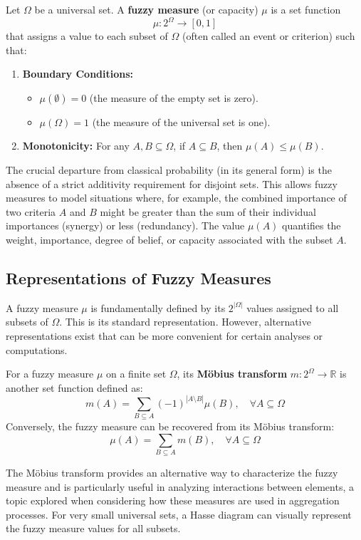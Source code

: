 \begin{definition}
Let $\Omega$ be a universal set. A \textbf{fuzzy measure} (or capacity) $\mu$ is a set function
\[ \mu: 2^\Omega \to [0, 1] \]
that assigns a value to each subset of $\Omega$ (often called an event or criterion) such that:
\begin{enumerate}
    \item \textbf{Boundary Conditions:}
    \begin{itemize}
        \item $\mu(\emptyset) = 0$ (the measure of the empty set is zero).
        \item $\mu(\Omega) = 1$ (the measure of the universal set is one).
    \end{itemize}
    \item \textbf{Monotonicity:} For any $A, B \subseteq \Omega$, if $A \subseteq B$, then $\mu(A) \le \mu(B)$.
\end{enumerate}
\end{definition}

The crucial departure from classical probability (in its general form) is the absence of a strict additivity requirement for disjoint sets. This allows fuzzy measures to model situations where, for example, the combined importance of two criteria $A$ and $B$ might be greater than the sum of their individual importances (synergy) or less (redundancy). The value $\mu(A)$ quantifies the weight, importance, degree of belief, or capacity associated with the subset $A$.

\subsection{Representations of Fuzzy Measures}
A fuzzy measure $\mu$ is fundamentally defined by its $2^{|\Omega|}$ values assigned to all subsets of $\Omega$. This is its standard representation. However, alternative representations exist that can be more convenient for certain analyses or computations.
\begin{definition}
For a fuzzy measure $\mu$ on a finite set $\Omega$, its \textbf{Möbius transform} $m: 2^\Omega \to \mathbb{R}$ is another set function defined as:
\[ m(A) = \sum_{B \subseteq A} (-1)^{|A \setminus B|} \mu(B), \quad \forall A \subseteq \Omega \]
Conversely, the fuzzy measure can be recovered from its Möbius transform:
\[ \mu(A) = \sum_{B \subseteq A} m(B), \quad \forall A \subseteq \Omega \]
\end{definition}
The Möbius transform provides an alternative way to characterize the fuzzy measure and is particularly useful in analyzing interactions between elements, a topic explored when considering how these measures are used in aggregation processes. For very small universal sets, a Hasse diagram can visually represent the fuzzy measure values for all subsets.


